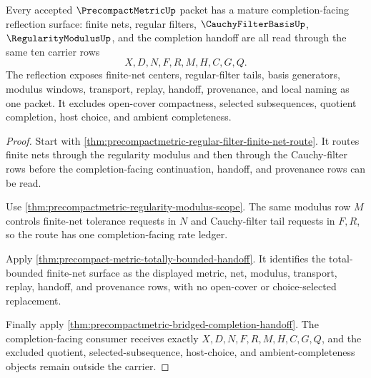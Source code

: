 \begin{theorem}
\label{thm:precompactmetric-mature-completion-reflection}
Every accepted $\PrecompactMetricUp$ packet has a mature completion-facing
reflection surface: finite nets, regular filters, $\CauchyFilterBasisUp$,
$\RegularityModulusUp$, and the completion handoff are all read through the
same ten carrier rows
$$
X,D,N,F,R,M,H,C,G,Q .
$$
The reflection exposes finite-net centers, regular-filter tails, basis
generators, modulus windows, transport, replay, handoff, provenance, and local
naming as one packet. It excludes open-cover compactness, selected
subsequences, quotient completion, host choice, and ambient completeness.
\end{theorem}
\begin{proof}
Start with \autoref{thm:precompactmetric-regular-filter-finite-net-route}.
It routes finite nets through the regularity modulus and then through the
Cauchy-filter rows before the completion-facing continuation, handoff, and
provenance rows can be read.

Use \autoref{thm:precompactmetric-regularity-modulus-scope}. The same modulus
row $M$ controls finite-net tolerance requests in $N$ and Cauchy-filter tail
requests in $F,R$, so the route has one completion-facing rate ledger.

Apply \autoref{thm:precompact-metric-totally-bounded-handoff}. It identifies
the total-bounded finite-net surface as the displayed metric, net, modulus,
transport, replay, handoff, and provenance rows, with no open-cover or
choice-selected replacement.

Finally apply \autoref{thm:precompactmetric-bridged-completion-handoff}. The
completion-facing consumer receives exactly $X,D,N,F,R,M,H,C,G,Q$, and the
excluded quotient, selected-subsequence, host-choice, and ambient-completeness
objects remain outside the carrier.
\end{proof}


